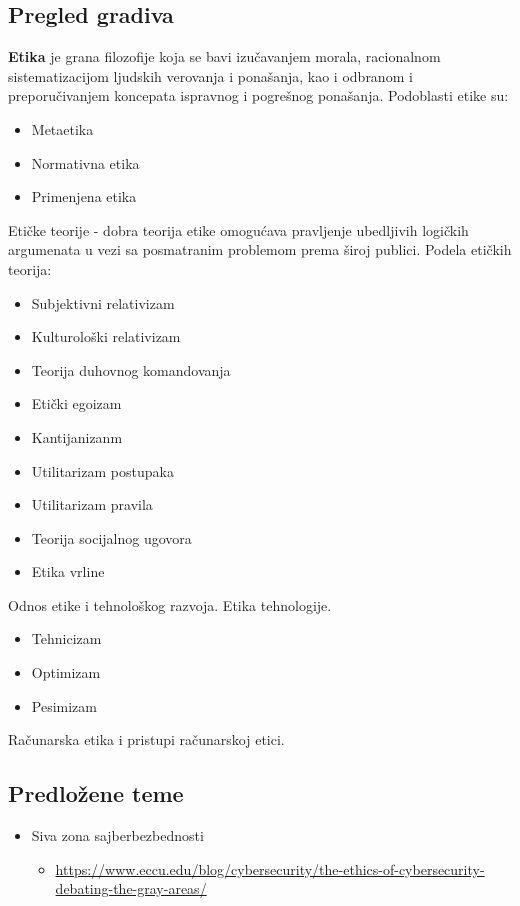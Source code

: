 \documentclass[a4paper,12pt]{article}
\begin{document}
\subsection{Pregled gradiva}
\textbf{Etika} je grana filozofije koja se bavi izučavanjem morala, racionalnom sistematizacijom ljudskih verovanja i ponašanja, kao i odbranom i preporučivanjem koncepata ispravnog i pogrešnog ponašanja.
Podoblasti etike su:
\begin{itemize}
    \item Metaetika
    \item Normativna etika
    \item Primenjena etika
\end{itemize}
Etičke teorije - dobra teorija etike omogućava pravljenje ubedljivih logičkih argumenata u vezi sa posmatranim problemom prema široj publici.
Podela etičkih teorija:
\begin{itemize}
    \item Subjektivni relativizam
    \item Kulturološki relativizam
    \item Teorija duhovnog komandovanja
    \item Etički egoizam
    \item Kantijanizanm
    \item Utilitarizam postupaka
    \item Utilitarizam pravila 
    \item Teorija socijalnog ugovora
    \item Etika vrline
\end{itemize}
Odnos etike i tehnološkog razvoja. Etika tehnologije.
\begin{itemize}
    \item Tehnicizam
    \item Optimizam
    \item Pesimizam
\end{itemize}
Računarska etika i pristupi računarskoj etici.
\subsection{Predložene teme}
\begin{itemize}
    \item Siva zona sajberbezbednosti
    \begin{itemize}
        \item \url{https://www.eccu.edu/blog/cybersecurity/the-ethics-of-cybersecurity-debating-the-gray-areas/}
    \end{itemize}
\end{itemize}
\end{document}
